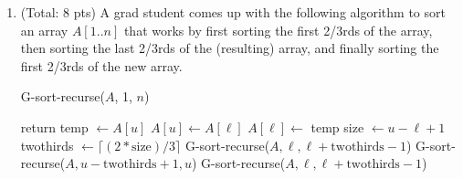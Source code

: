 \documentclass[11pt]{article}
\begin{document}
\begin{enumerate}
\item (Total: 8 pts) A grad student comes up with the following algorithm to sort an array $A[1..n]$ that works by first sorting the first 2/3rds of the array, then sorting the last 2/3rds of the (resulting) array,
and finally sorting the first 2/3rds of the new array.

\begin{algorithmic}[1]
 
	\State G-sort-recurse($A$, 1, $n$)
\EndFunction

	\State return 
 
	 
		\State  temp $\gets A[u]$
		\State $A[u] \gets A[\ell]$
		\State $A[\ell] \gets$ temp
	\EndIf
\Else {}
\State size $\gets u - \ell + 1$
\State twothirds $\gets \lceil (2 * \mbox{size})  / 3 \rceil$
\State G-sort-recurse($A, \ell, \ell + \mbox{twothirds} - 1$)
\State G-sort-recurse($A, u - \mbox{twothirds}+1 , u$)
\State G-sort-recurse($A, \ell, \ell + \mbox{twothirds} - 1$)
\EndIf 
\EndFunction
\end{algorithmic}


\end{enumerate}
\end{document}
